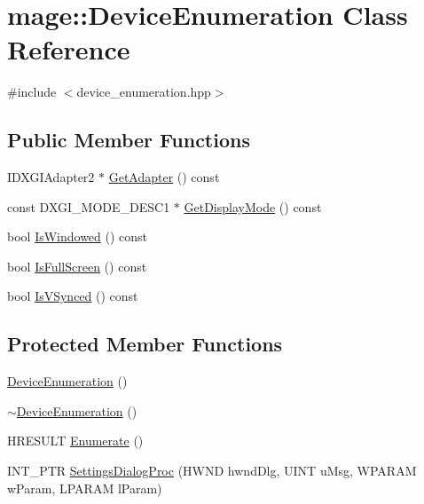 \hypertarget{classmage_1_1_device_enumeration}{}\section{mage\+:\+:Device\+Enumeration Class Reference}
\label{classmage_1_1_device_enumeration}


{\ttfamily \#include $<$device\+\_\+enumeration.\+hpp$>$}

\subsection*{Public Member Functions}
\begin{DoxyCompactItemize}
\item 
I\+D\+X\+G\+I\+Adapter2 $\ast$ \hyperlink{classmage_1_1_device_enumeration_a7bdbc5aad3cd2578db6ed8c4aaffd34d}{Get\+Adapter} () const
\item 
const D\+X\+G\+I\+\_\+\+M\+O\+D\+E\+\_\+\+D\+E\+S\+C1 $\ast$ \hyperlink{classmage_1_1_device_enumeration_a533ac2f6ea91604a3ea3cc8d93c3de87}{Get\+Display\+Mode} () const
\item 
bool \hyperlink{classmage_1_1_device_enumeration_a51479c8c85b286f78730c5622604e524}{Is\+Windowed} () const
\item 
bool \hyperlink{classmage_1_1_device_enumeration_a8957ecacc567708e80694b25aa141c4e}{Is\+Full\+Screen} () const
\item 
bool \hyperlink{classmage_1_1_device_enumeration_a035e2430142e4e4ffcbc712f83e1e7e0}{Is\+V\+Synced} () const
\end{DoxyCompactItemize}
\subsection*{Protected Member Functions}
\begin{DoxyCompactItemize}
\item 
\hyperlink{classmage_1_1_device_enumeration_aa000048648beb6c2aca70e5ef04e0da2}{Device\+Enumeration} ()
\item 
\hyperlink{classmage_1_1_device_enumeration_a6a8cfc259c1e8c98ba0a9780c42a5ffe}{$\sim$\+Device\+Enumeration} ()
\item 
H\+R\+E\+S\+U\+LT \hyperlink{classmage_1_1_device_enumeration_a4fea0ffef733632456b281f74608a239}{Enumerate} ()
\item 
I\+N\+T\+\_\+\+P\+TR \hyperlink{classmage_1_1_device_enumeration_a5950a6575d9073d6d23b228779f5ace1}{Settings\+Dialog\+Proc} (H\+W\+ND hwnd\+Dlg, U\+I\+NT u\+Msg, W\+P\+A\+R\+AM w\+Param, L\+P\+A\+R\+AM l\+Param)
\end{DoxyCompactItemize}
